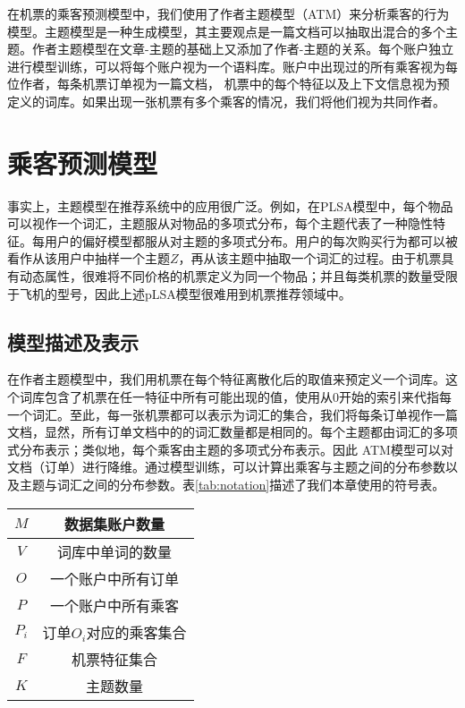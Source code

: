 在机票的乘客预测模型中，我们使用了作者主题模型（ATM）\cite{rosen2004author,steyvers2004probabilistic,rosen2010learning}来分析乘客的行为模型。主题模型是一种生成模型，其主要观点是一篇文档可以抽取出混合的多个主题。作者主题模型在文章-主题的基础上又添加了作者-主题的关系。每个账户独立进行模型训练，可以将每个账户视为一个语料库。账户中出现过的所有乘客视为每位作者，每条机票订单视为一篇文档， 机票中的每个特征以及上下文信息视为预定义的词库。如果出现一张机票有多个乘客的情况，我们将他们视为共同作者。

\section{乘客预测模型}
事实上，主题模型在推荐系统中的应用很广泛。例如，在PLSA模型中，每个物品可以视作一个词汇，主题服从对物品的多项式分布，每个主题代表了一种隐性特征。每用户的偏好模型都服从对主题的多项式分布。用户的每次购买行为都可以被看作从该用户中抽样一个主题$Z$，再从该主题中抽取一个词汇的过程。由于机票具有动态属性，很难将不同价格的机票定义为同一个物品；并且每类机票的数量受限于飞机的型号，因此上述pLSA模型很难用到机票推荐领域中。

\subsection{模型描述及表示}

在作者主题模型中，我们用机票在每个特征离散化后的取值来预定义一个词库。这个词库包含了机票在任一特征中所有可能出现的值，使用从0开始的索引来代指每一个词汇。至此，每一张机票都可以表示为词汇的集合，我们将每条订单视作一篇文档，显然，所有订单文档中的的词汇数量都是相同的。每个主题都由词汇的多项式分布表示；类似地，每个乘客由主题的多项式分布表示。因此
ATM模型可以对文档（订单）进行降维。通过模型训练，可以计算出乘客与主题之间的分布参数以及主题与词汇之间的分布参数。表\ref{tab:notation}描述了我们本章使用的符号表。

\begin{table}[!hpb]
\centering
\begin{tabular}{|c|c|} \hline
$M$ & 数据集账户数量\\ \hline
$V$ & 词库中单词的数量\\ \hline
$O$ & 一个账户中所有订单\\ \hline
$P$ & 一个账户中所有乘客\\ \hline
$P_i$ & 订单$O_i$对应的乘客集合 \\ \hline
$F$ & 机票特征集合\\ \hline
$K$ & 主题数量\\ \hline
\end{tabular}
\end{table}

